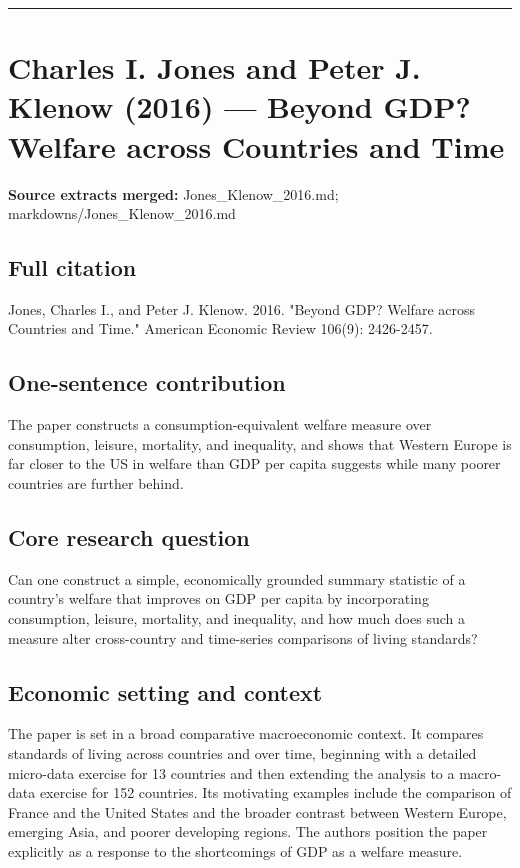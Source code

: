 \documentclass[11pt,a4paper]{article}
\begin{document}
\medskip\hrule\medskip

\section*{Charles I. Jones and Peter J. Klenow (2016) — Beyond GDP? Welfare across Countries and Time}

\textbf{Source extracts merged:} Jones\_Klenow\_2016.md; markdowns/Jones\_Klenow\_2016.md

\subsection*{Full citation}
Jones, Charles I., and Peter J. Klenow. 2016. "Beyond GDP? Welfare across Countries and Time." American Economic Review 106(9): 2426-2457.

\subsection*{One-sentence contribution}
The paper constructs a consumption-equivalent welfare measure over consumption, leisure, mortality, and inequality, and shows that Western Europe is far closer to the US in welfare than GDP per capita suggests while many poorer countries are further behind.

\subsection*{Core research question}
Can one construct a simple, economically grounded summary statistic of a country’s welfare that improves on GDP per capita by incorporating consumption, leisure, mortality, and inequality, and how much does such a measure alter cross-country and time-series comparisons of living standards?

\subsection*{Economic setting and context}
The paper is set in a broad comparative macroeconomic context. It compares standards of living across countries and over time, beginning with a detailed micro-data exercise for 13 countries and then extending the analysis to a macro-data exercise for 152 countries. Its motivating examples include the comparison of France and the United States and the broader contrast between Western Europe, emerging Asia, and poorer developing regions. The authors position the paper explicitly as a response to the shortcomings of GDP as a welfare measure.
\end{document}
